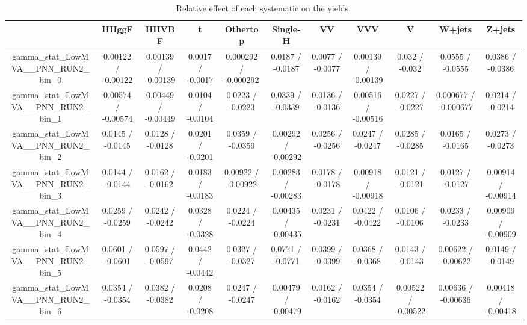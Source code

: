 \documentclass[10pt]{article}
\begin{document}
\begin{table}[htbp]
\begin{center}
\begin{tabular}{|c|c|c|c|c|c|c|c|c|c|c|}
\hline 
      & HHggF      & HHVBF      & t      & Othertop      & Single-H      & VV      & VVV      & V      & W+jets      & Z+jets \\ 
\hline 
  gamma_stat_LowMVA__PNN_RUN2_bin_0 & 0.00122 / -0.00122 & 0.00139 / -0.00139 & 0.0017 / -0.0017 & 0.000292 / -0.000292 & 0.0187 / -0.0187 & 0.0077 / -0.0077 & 0.00139 / -0.00139 & 0.032 / -0.032 & 0.0555 / -0.0555 & 0.0386 / -0.0386 \\ 
  gamma_stat_LowMVA__PNN_RUN2_bin_1 & 0.00574 / -0.00574 & 0.00449 / -0.00449 & 0.0104 / -0.0104 & 0.0223 / -0.0223 & 0.0339 / -0.0339 & 0.0136 / -0.0136 & 0.00516 / -0.00516 & 0.0227 / -0.0227 & 0.000677 / -0.000677 & 0.0214 / -0.0214 \\ 
  gamma_stat_LowMVA__PNN_RUN2_bin_2 & 0.0145 / -0.0145 & 0.0128 / -0.0128 & 0.0201 / -0.0201 & 0.0359 / -0.0359 & 0.00292 / -0.00292 & 0.0256 / -0.0256 & 0.0247 / -0.0247 & 0.0285 / -0.0285 & 0.0165 / -0.0165 & 0.0273 / -0.0273 \\ 
  gamma_stat_LowMVA__PNN_RUN2_bin_3 & 0.0144 / -0.0144 & 0.0162 / -0.0162 & 0.0183 / -0.0183 & 0.00922 / -0.00922 & 0.00283 / -0.00283 & 0.0178 / -0.0178 & 0.00918 / -0.00918 & 0.0121 / -0.0121 & 0.0127 / -0.0127 & 0.00914 / -0.00914 \\ 
  gamma_stat_LowMVA__PNN_RUN2_bin_4 & 0.0259 / -0.0259 & 0.0242 / -0.0242 & 0.0328 / -0.0328 & 0.0224 / -0.0224 & 0.00435 / -0.00435 & 0.0231 / -0.0231 & 0.0422 / -0.0422 & 0.0106 / -0.0106 & 0.0233 / -0.0233 & 0.00909 / -0.00909 \\ 
  gamma_stat_LowMVA__PNN_RUN2_bin_5 & 0.0601 / -0.0601 & 0.0597 / -0.0597 & 0.0442 / -0.0442 & 0.0327 / -0.0327 & 0.0771 / -0.0771 & 0.0399 / -0.0399 & 0.0368 / -0.0368 & 0.0143 / -0.0143 & 0.00622 / -0.00622 & 0.0149 / -0.0149 \\ 
  gamma_stat_LowMVA__PNN_RUN2_bin_6 & 0.0354 / -0.0354 & 0.0382 / -0.0382 & 0.0208 / -0.0208 & 0.0247 / -0.0247 & 0.00479 / -0.00479 & 0.0162 / -0.0162 & 0.0354 / -0.0354 & 0.00522 / -0.00522 & 0.00636 / -0.00636 & 0.00418 / -0.00418 \\ 
\hline 
\end{tabular} 
\caption{Relative effect of each systematic on the yields.} 
\end{center} 
\end{table} 
\end{document}
